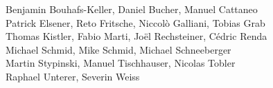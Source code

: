 %
%
%
Benjamin Bouhafs-Keller,	%
Daniel Bucher, 			%
Manuel Cattaneo%
\\
Patrick Elsener,		%
Reto Fritsche,			%
Niccolò Galliani,		%
Tobias Grab%
\\
Thomas Kistler,		%
Fabio Marti,			%
Joël Rechsteiner,		%
Cédric Renda%
\\
Michael Schmid,			%
Mike Schmid,			%
Michael Schneeberger%
\\
Martin Stypinski,		%
Manuel Tischhauser,		%
Nicolas Tobler%
\\
Raphael Unterer,		%
Severin Weiss%
